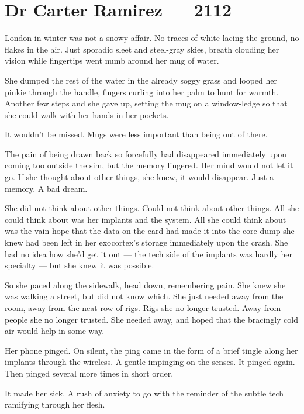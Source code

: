 \hypertarget{dr-carter-ramirez-2112}{%
\chapter*{Dr Carter Ramirez — 2112}\label{dr-carter-ramirez-2112}}

London in winter was not a snowy affair. No traces of white lacing the ground, no flakes in the air. Just sporadic sleet and steel-gray skies, breath clouding her vision while fingertips went numb around her mug of water.

She dumped the rest of the water in the already soggy grass and looped her pinkie through the handle, fingers curling into her palm to hunt for warmth. Another few steps and she gave up, setting the mug on a window-ledge so that she could walk with her hands in her pockets.

It wouldn't be missed. Mugs were less important than being out of there.

The pain of being drawn back so forcefully had disappeared immediately upon coming too outside the sim, but the memory lingered. Her mind would not let it go. If she thought about other things, she knew, it would disappear. Just a memory. A bad dream.

She did not think about other things. Could not think about other things. All she could think about was her implants and the system. All she could think about was the vain hope that the data on the card had made it into the core dump she knew had been left in her exocortex's storage immediately upon the crash. She had no idea how she'd get it out — the tech side of the implants was hardly her specialty — but she knew it was possible.

So she paced along the sidewalk, head down, remembering pain. She knew she was walking a street, but did not know which. She just needed away from the room, away from the neat row of rigs. Rigs she no longer trusted. Away from people she no longer trusted. She needed away, and hoped that the bracingly cold air would help in some way.

Her phone pinged. On silent, the ping came in the form of a brief tingle along her implants through the wireless. A gentle impinging on the senses. It pinged again. Then pinged several more times in short order.

It made her sick. A rush of anxiety to go with the reminder of the subtle tech ramifying through her flesh.

